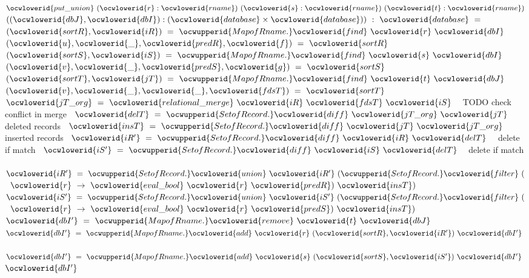 \documentclass[12pt]{article}
\begin{document}
\label{rellens.ml:25182}%
\ocwindent{0.00em}
~$\ocwlowerid{put\_union}~(\ocwlowerid{r}:\ocwlowerid{rname})~(\ocwlowerid{s}:\ocwlowerid{rname})~(\ocwlowerid{t}:\ocwlowerid{rname})$\ocweol
\ocwindent{2.00em}
$((\ocwlowerid{dbJ},\ocwlowerid{dbI}):(\ocwlowerid{database}\times{}\ocwlowerid{database}))~:~\ocwlowerid{database}~=$\ocweol
\ocwindent{1.00em}
~$(\ocwlowerid{sortR},\ocwlowerid{iR})~=~\ocwupperid{MapofRname.}\ocwlowerid{find}~\ocwlowerid{r}~\ocwlowerid{dbI}~$\ocweol
\ocwindent{1.00em}
~$(\ocwlowerid{u},\ocwlowerid{\_},\ocwlowerid{predR},\ocwlowerid{f})~=~\ocwlowerid{sortR}~$\ocweol
\ocwindent{1.00em}
~$(\ocwlowerid{sortS},\ocwlowerid{iS})~=~\ocwupperid{MapofRname.}\ocwlowerid{find}~\ocwlowerid{s}~\ocwlowerid{dbI}~$\ocweol
\ocwindent{1.00em}
~$(\ocwlowerid{v},\ocwlowerid{\_},\ocwlowerid{predS},\ocwlowerid{g})~=~\ocwlowerid{sortS}~$\ocweol
\ocwindent{1.00em}
~$(\ocwlowerid{sortT},\ocwlowerid{jT})~=~\ocwupperid{MapofRname.}\ocwlowerid{find}~\ocwlowerid{t}~\ocwlowerid{dbJ}~$\ocweol
\ocwindent{1.00em}
~$(\ocwlowerid{v},\ocwlowerid{\_},\ocwlowerid{\_},\ocwlowerid{fdsT})~=~\ocwlowerid{sortT}~$\ocweol
\ocwindent{1.00em}
~$\ocwlowerid{jT\_org}~=~\ocwlowerid{relational\_merge}~\ocwlowerid{iR}~\ocwlowerid{fdsT}~\ocwlowerid{iS}~$~\ocwbc{} TODO check conflict in merge \ocwec{}\ocweol
\ocwindent{1.00em}
~$\ocwlowerid{delT}~=~\ocwupperid{SetofRecord.}\ocwlowerid{diff}~\ocwlowerid{jT\_org}~\ocwlowerid{jT}~$~\ocwbc{} deleted records \ocwec{}\ocweol
\ocwindent{1.00em}
~$\ocwlowerid{insT}~=~\ocwupperid{SetofRecord.}\ocwlowerid{diff}~\ocwlowerid{jT}~\ocwlowerid{jT\_org}~$~\ocwbc{} inserted records \ocwec{}\ocweol
\ocwindent{1.00em}
~$\ocwlowerid{iR'}~=~\ocwupperid{SetofRecord.}\ocwlowerid{diff}~\ocwlowerid{iR}~\ocwlowerid{delT}~$~\ocwbc{} delete if match \ocwec{}\ocweol
\ocwindent{1.00em}
~$\ocwlowerid{iS'}~=~\ocwupperid{SetofRecord.}\ocwlowerid{diff}~\ocwlowerid{iS}~\ocwlowerid{delT}~$~\ocwbc{} delete if match \ocwec{}\ocweol
\ocwindent{1.00em}
~$\ocwlowerid{iR'}~=~\ocwupperid{SetofRecord.}\ocwlowerid{union}~\ocwlowerid{iR'}~(\ocwupperid{SetofRecord.}\ocwlowerid{filter}~($~$\ocwlowerid{r}~\rightarrow{}~\ocwlowerid{eval\_bool}~\ocwlowerid{r}~\ocwlowerid{predR})~\ocwlowerid{insT})~$\ocweol
\ocwindent{1.00em}
~$\ocwlowerid{iS'}~=~\ocwupperid{SetofRecord.}\ocwlowerid{union}~\ocwlowerid{iS'}~(\ocwupperid{SetofRecord.}\ocwlowerid{filter}~($~$\ocwlowerid{r}~\rightarrow{}~\ocwlowerid{eval\_bool}~\ocwlowerid{r}~\ocwlowerid{predS})~\ocwlowerid{insT})~$\ocweol
\ocwindent{1.00em}
~$\ocwlowerid{dbI'}~=~\ocwupperid{MapofRname.}\ocwlowerid{remove}~\ocwlowerid{t}~\ocwlowerid{dbJ}~$\ocweol
\ocwindent{1.00em}
~$\ocwlowerid{dbI'}~=~\ocwupperid{MapofRname.}\ocwlowerid{add}~\ocwlowerid{r}~(\ocwlowerid{sortR},\ocwlowerid{iR'})~\ocwlowerid{dbI'}~$\ocweol
\ocwindent{1.00em}
~$\ocwlowerid{dbI'}~=~\ocwupperid{MapofRname.}\ocwlowerid{add}~\ocwlowerid{s}~(\ocwlowerid{sortS},\ocwlowerid{iS'})~\ocwlowerid{dbI'}~$\ocweol
\ocwindent{1.00em}
$\ocwlowerid{dbI'}$\medskip
\end{document}
